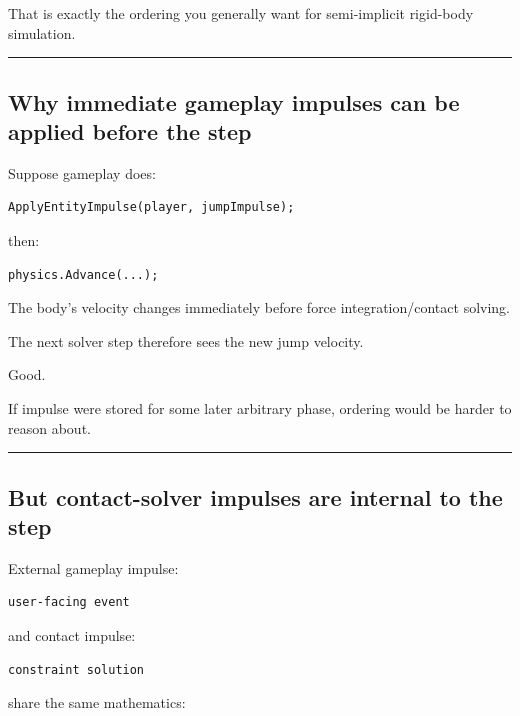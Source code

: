 That is exactly the ordering you generally want for semi-implicit rigid-body simulation.

\begin{center}\rule{0.5\linewidth}{0.5pt}\end{center}

\subsection{Why immediate gameplay impulses can be applied before the step}\label{06-engine-ii-ch037-why-immediate-gameplay-impulses-can-be-applied-before-the-step}

Suppose gameplay does:

\begin{verbatim}
ApplyEntityImpulse(player, jumpImpulse);
\end{verbatim}

then:

\begin{verbatim}
physics.Advance(...);
\end{verbatim}

The body's velocity changes immediately before force integration/contact solving.

The next solver step therefore sees the new jump velocity.

Good.

If impulse were stored for some later arbitrary phase, ordering would be harder to reason about.

\begin{center}\rule{0.5\linewidth}{0.5pt}\end{center}

\subsection{But contact-solver impulses are internal to the step}\label{06-engine-ii-ch037-but-contact-solver-impulses-are-internal-to-the-step}

External gameplay impulse:

\begin{verbatim}
user-facing event
\end{verbatim}

and contact impulse:

\begin{verbatim}
constraint solution
\end{verbatim}

share the same mathematics:

